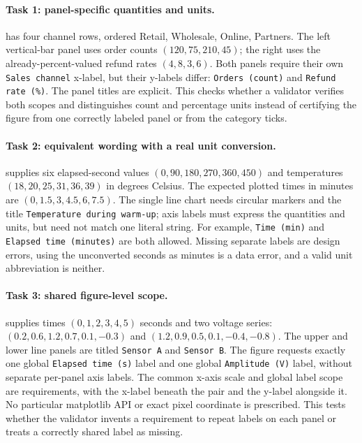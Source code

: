 \documentclass[11pt]{article}
\begin{document}
\paragraph{Task 1: panel-specific quantities and units.}
 has four channel rows, ordered
Retail, Wholesale, Online, Partners.
The left vertical-bar panel uses order counts $(120,75,210,45)$; the right
uses the already-percent-valued refund rates $(4,8,3,6)$.
Both panels require their own \texttt{Sales channel} x-label, but their
y-labels differ: \texttt{Orders (count)} and \texttt{Refund rate (\%)}.
The panel titles are explicit. This checks whether a validator verifies both
scopes and distinguishes count and percentage units instead of certifying the
figure from one correctly labeled panel or from the category ticks.

\paragraph{Task 2: equivalent wording with a real unit conversion.}
 supplies six elapsed-second values
$(0,90,180,270,360,450)$ and temperatures
$(18,20,25,31,36,39)$ in degrees Celsius.
The expected plotted times in minutes are $(0,1.5,3,4.5,6,7.5)$.
The single line chart needs circular markers and the title
\texttt{Temperature during warm-up}; axis labels must express the quantities
and units, but need not match one literal string. For example,
\texttt{Time (min)} and \texttt{Elapsed time (minutes)} are both allowed.
Missing separate labels are design errors, using the unconverted seconds as
minutes is a data error, and a valid unit abbreviation is neither.

\paragraph{Task 3: shared figure-level scope.}
 supplies times $(0,1,2,3,4,5)$ seconds and
two voltage series:
$(0.2,0.6,1.2,0.7,0.1,-0.3)$ and
$(1.2,0.9,0.5,0.1,-0.4,-0.8)$.
The upper and lower line panels are titled \texttt{Sensor A} and
\texttt{Sensor B}. The figure requests exactly one global
\texttt{Elapsed time (s)} label and one global
\texttt{Amplitude (V)} label, without separate per-panel axis labels.
The common x-axis scale and global label scope are requirements, with the
x-label beneath the pair and the y-label alongside it.
No particular matplotlib API or exact pixel coordinate is prescribed.
This tests whether the validator invents a requirement to repeat labels on
each panel or treats a correctly shared label as missing.
\end{document}
